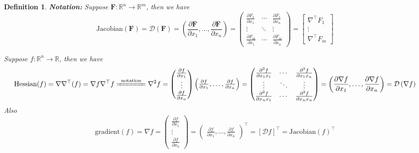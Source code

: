 \documentclass[11pt]{article}
\theoremstyle{plain} %
\newtheorem{definition}[theorem]{Definition}
\theoremstyle{remark}
\begin{document}
\begin{definition}
  \textbf{Notation:} Suppose $\mathbf{F} : \mathbb{R}^n \rightarrow \mathbb{R}^m$, then we have
  $$
    \text{Jacobian}(\mathbf{F}) = \mathcal{D}(\mathbf{F})
    = \left(\frac{\partial \mathbf{F}}{\partial x_1}, \ldots, \frac{\partial \mathbf{F}}{\partial x_n}\right)
    = \begin{pmatrix}
      \frac{\partial F_1}{\partial x_1} & \cdots & \frac{\partial F_1}{\partial x_n} \\
      \vdots                            & \ddots & \vdots                            \\
      \frac{\partial F_m}{\partial x_1} & \cdots & \frac{\partial F_m}{\partial x_n}
    \end{pmatrix}
    =\left[\begin{array}{c}
      \nabla^{\top} F_1 \\
      \vdots \\
      \nabla^{\top} F_m
      \end{array}\right]
  $$

  Suppose $f: \mathbb{R}^n \rightarrow \mathbb{R}$, then we have
  $$
    \text{Hessian}(f) = \nabla\nabla^\top(f) = \nabla f\nabla^\top f \xlongequal{\text{ notation }} \nabla^2 f     
                      = \begin{pmatrix}
                            \frac{\partial f}{\partial x_1} \\
                            \vdots                          \\
                            \frac{\partial f}{\partial x_n}
                          \end{pmatrix}
    \begin{pmatrix}
      \frac{\partial f}{\partial x_1}, \ldots, \frac{\partial f}{\partial x_n}
    \end{pmatrix}                                     
                      = \begin{pmatrix}
                            \frac{\partial^2 f}{\partial x_1 x_1} & \cdots & \frac{\partial^2 f}{\partial x_1x_n} \\
                            \vdots                                & \ddots & \vdots                               \\
                            \frac{\partial^2 f}{\partial x_nx_1}  & \cdots & \frac{\partial^2 f}{\partial x_nx_n}
                          \end{pmatrix} 
      = \left(\frac{\partial \nabla f}{\partial x_1}, \ldots, \frac{\partial \nabla f}{\partial x_n}\right)
      = \mathcal{D}\left(\nabla f\right)
  $$
  Also
  $$
  \text{gradient}(f) = \nabla f = \begin{pmatrix}
    \frac{\partial f}{\partial x_1} \\
    \vdots                          \\
    \frac{\partial f}{\partial x_n}
  \end{pmatrix} =  \begin{pmatrix}
    \frac{\partial f}{\partial x_1}, \ldots, \frac{\partial f}{\partial x_n}
  \end{pmatrix}^\top  = \left[\mathcal{D}f\right]^\top = \text{Jacobian}(f)^\top
  $$
\end{definition}
\newpage
\end{document}

